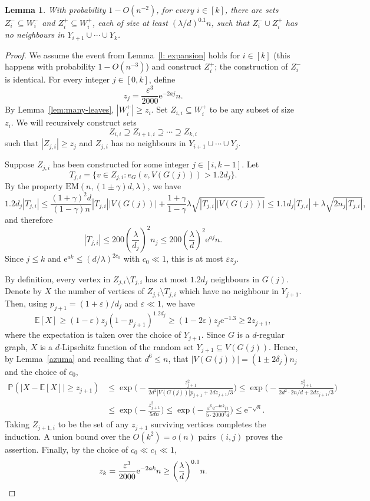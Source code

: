 \documentclass[reqno,a4paper]{amsart}
\newtheorem{lemma}[theorem]{Lemma}
\theoremstyle{definition}
\newcommand{\eps}{\varepsilon}
\newcommand{\e}{\mathrm{e}}
\newcommand{\EM}{\mathrm{EM}}
\begin{document}
\begin{lemma}\label{lem:restrict}
With probability $1-O(n^{-2})$, for every $i\in[k]$, there are sets $Z_i^-\subseteq W_i^-$ and $Z_i^+\subseteq W_i^+$, each of size at least $(\lambda/d)^{0.1}n$, such that $Z_i^-\cup Z_i^+$ has no neighbours in $Y_{i+1}\cup\cdots\cup Y_k$.
\end{lemma}
\begin{proof}
We assume the event from Lemma~\ref{l: expansion} holds for $i\in [k]$ (this happens with probability $1-O(n^{-3})$) and construct $Z_i^+$; the construction of $Z_i^-$ is identical. For every integer $j\in [0,k]$, define
\[
    z_j=\frac{\eps^3}{2000}\e^{-2aj}n.
\]
By Lemma~\ref{lem:many-leaves}, $|W_i^+|\ge z_i$. Set $Z_{i,i}\subseteq W_i^+$ to be any subset of size $z_i$. We will recursively construct sets
\[
    Z_{i,i}\supseteq Z_{i+1,i}\supseteq\cdots\supseteq Z_{k,i}
\]
such that $|Z_{j,i}|\ge z_j$ and $Z_{j,i}$ has no neighbours in $Y_{i+1}\cup\cdots\cup Y_j$.

Suppose $Z_{j,i}$ has been constructed for some integer $j\in [i,k-1]$. Let
\[
    T_{j,i}=\{v\in Z_{j,i}:e_G(v,V(G(j)))>1.2d_j\}.
\]
By the property $\EM(n,(1\pm \gamma)d,\lambda)$, we have
\[
    1.2d_j|T_{j,i}|
    \le \frac{(1+\gamma)^2d}{(1-\gamma)n}|T_{j,i}||V(G(j))|+\frac{1+\gamma}{1-\gamma}\lambda\sqrt{|T_{j,i}||V(G(j))|}
    \le 1.1d_j|T_{j,i}|+\lambda\sqrt{2n_j|T_{j,i}|},
\]
and therefore
\[
    |T_{j,i}|\le 200\left(\frac{\lambda}{d_j}\right)^2n_j
    \le 200\left(\frac{\lambda}{d}\right)^2\e^{aj}n.
\]
Since $j\le k$ and $\e^{ak}\le (d/\lambda)^{2c_0}$ with $c_0\ll 1$, this is at most $\eps z_j$.

By definition, every vertex in $Z_{j,i}\setminus T_{j,i}$ has at most $1.2d_j$ neighbours in $G(j)$. 
Denote by $X$ the number of vertices of $Z_{j,i}\setminus T_{j,i}$ which have no neighbour in $Y_{j+1}$. Then, using $p_{j+1}=(1+\eps)/d_j$ and $\eps\ll 1$, we have
\[
    \mathbb E[X] \ge (1-\eps)z_j(1-p_{j+1})^{1.2d_j}\ge (1-2\eps)z_j\e^{-1.3}\ge 2z_{j+1},
\]
where the expectation is taken over the choice of $Y_{j+1}$.
Since $G$ is a $d$-regular graph, $X$ is a $d$-Lipschitz function of the random set $Y_{j+1}\subseteq V(G(j))$. Hence, by Lemma~\ref{azuma} and recalling that $d^6\le n$, that $|V(G(j))|=(1\pm 2\delta_j)n_j$ and the choice of $c_0$,
\begin{align*}
    \mathbb P(|X-\mathbb E[X]|\ge z_{j+1})&\le \exp\bigg(-\frac{z_{j+1}^2}{2d^2|V(G(j))|p_{j+1}+2dz_{j+1}/3}\bigg)\le\exp\bigg(-\frac{z_{j+1}^2}{2d^2\cdot 2n/d+2dz_{j+1}/3}\bigg)\\
    &\le \exp\bigg(-\frac{z_{j+1}^2}{5dn}\bigg)\le \exp\bigg(-\frac{\eps^6 \e^{-4ak} n}{5\cdot 2000^2 d}\bigg)\le \e^{-\sqrt{n}}.
\end{align*}
Taking $Z_{j+1,i}$ to be the set of any $z_{j+1}$ surviving vertices completes the induction.
A union bound over the $O(k^2)=o(n)$ pairs $(i,j)$ proves the assertion. Finally, by the choice of $c_0\ll c_1\ll 1$,
\[
    z_k=\frac{\eps^3}{2000}\e^{-2ak}n\ge \bigg(\frac{\lambda}{d}\bigg)^{0.1}n.\qedhere
\]
\end{proof}
\end{document}
